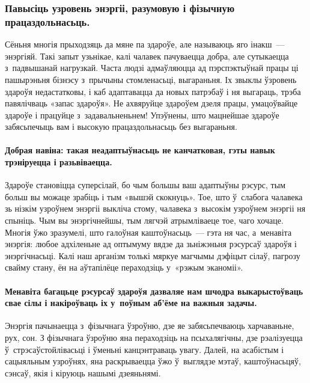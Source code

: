 \subsubsection{Павысіць узровень энэргіі, разумовую і фізычную працаздольнасьць.} 
Сёньня многія прыходзяць да мяне па здароўе, але называюць яго інакш~--- энэргіяй. Такі запыт узьнікае, калі чалавек пачуваецца добра, але сутыкаецца з~падвышанай нагрузкай. Часта людзі адмаўляюцца ад пэрспэктыўнай працы ці пашырэньня бізнэсу з~прычыны стомленасьці, выгараньня. Іх звыклы ўзровень здароўя недастатковы, і каб адаптавацца да новых патрэбаў і ня выгараць, трэба павялічваць «запас здароўя». Не ахвяруйце здароўем дзеля працы, умацоўвайце здароўе і працуйце з~задавальненьнем! Упэўнены, што мацнейшае здароўе забясьпечыць вам і высокую працаздольнасьць без выгараньня.

\paragraph{Добрая навіна: такая неадаптыўнасьць не канчатковая, гэты навык трэніруецца і разьвіваецца.} Здароўе становіцца суперсілай, бо чым большы ваш адаптыўны рэсурс, тым больш вы можаце зрабіць і тым «вышэй скокнуць». Тое, што ў~слабога чалавека зь нізкім узроўнем энэргіі выкліча стому, чалавека з~высокім узроўнем энэргіі ня спыніць. Чым вы энэргічнейшы, тым лягчэй атрымліваеце тое, чаго хочаце. Многія ўжо зразумелі, што галоўная каштоўнасьць~--- гэта ня час, а~менавіта энэргія: любое адхіленьне ад оптымуму вядзе да зьніжэньня рэсурсаў здароўя і энэргічнасьці. Калі наш арганізм толькі мяркуе магчымы дэфіцыт сілаў, пагрозу свайму стану, ён на аўтапілёце пераходзіць у~«рэжым эканоміі».

\paragraph{Менавіта багацьце рэсурсаў здароўя дазваляе нам шчодра выкарыстоўваць свае сілы і накіроўваць іх у~поўным аб'ёме на важныя задачы.} Энэргія пачынаецца з~фізычнага ўзроўню, дзе яе забясьпечваюць харчаваньне, рух, сон. З фізычнага ўзроўню яна пераходзіць на псыхалягічны, дзе рэалізуецца ў~стрэсаўстойлівасьці і ўменьні канцэнтраваць увагу. Далей, на асабістым і сацыяльным узроўнях, яна раскрываецца ўжо ў~выглядзе мэтаў, каштоўнасьцяў, сэнсаў, якія і кіруюць нашымі дзеяньнямі.


